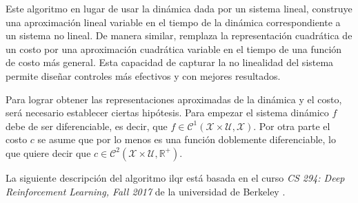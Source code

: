 Este algoritmo en lugar de usar la dinámica dada por un sistema lineal, construye una aproximación lineal variable en el tiempo de la dinámica correspondiente a un sistema no lineal. De manera similar, remplaza la representación cuadrática de un costo por una aproximación cuadrática variable en el tiempo de una función de costo más general. Esta capacidad de capturar la no linealidad del sistema permite diseñar controles más efectivos y con mejores resultados. \cite{berkeley2017deeprl}

Para lograr obtener las representaciones aproximadas de la dinámica y el costo, será necesario establecer ciertas hipótesis. Para empezar el sistema dinámico $f$ debe  de ser diferenciable, es decir, que $f\in\mathcal{C}^{1}(\mathcal{X}\times\mathcal{U}, \mathcal{X})$. Por otra parte el costo $c$ se asume que por lo menos es una función doblemente diferenciable, lo que quiere decir que $c \in \mathcal{C}^{2}\left(\mathcal{X}\times\mathcal{U}, \mathbb{R}^{+}\right)$.  

La siguiente descripción del algoritmo \acrshort{ilqr} está basada en el curso \textit{CS 294: Deep Reinforcement Learning, Fall 2017} de la universidad de Berkeley \cite{berkeley2017deeprl, hui2018rl}.


